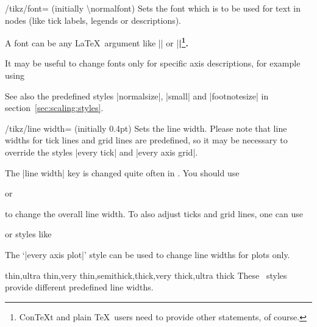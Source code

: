\begin{key}{/tikz/font= (initially \textbackslash normalfont)}
	Sets the font which is to be used for text in nodes (like tick labels, legends or descriptions).

	A font can be any \LaTeX\ argument like |\footnotesize| or |\small\bfseries|\footnote{Con\TeX t and plain \TeX\ users need to provide other statements, of course.}.

	It may be useful to change fonts only for specific axis descriptions, for example using
\begin{codeexample}
\end{codeexample}

	See also the predefined styles |normalsize|, |small| and |footnotesize| in section~\ref{sec:scaling:styles}.
\end{key}

\begin{key}{/tikz/line width= (initially 0.4pt)}
	Sets the line width. Please note that line widths for tick lines and grid lines are predefined, so it may be necessary to override the styles |every tick| and |every axis grid|.

	The |line width| key is changed quite often in \Tikz. You should use
\begin{codeexample}
\end{codeexample}
	or
\begin{codeexample}
\end{codeexample}
	to change the overall line width. To also adjust ticks and grid lines, one can use
\begin{codeexample}
\end{codeexample}
	or styles like
\begin{codeexample}
\end{codeexample}
	The `|every axis plot|' style can be used to change line widths for plots only.
\end{key}

\begin{keylist}[/tikz]{thin,ultra thin,very thin,semithick,thick,very thick,ultra thick}
	These \Tikz\ styles provide different predefined line widths.
\end{keylist}

